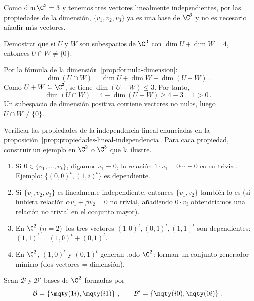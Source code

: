 \begin{questions}
\begin{solution}
    Como $\dim\C^3=3$ y tenemos tres vectores linealmente independientes, por las propiedades de la dimensión, $\{v_1,v_2,v_3\}$ ya es una base de $\C^3$ y no es necesario añadir más vectores.
  \end{solution}

  \question
  Demostrar que si $U$ y $W$ son subespacios de $\C^3$ con $\dim U+\dim W = 4$, entonces $U\cap W \neq \{0\}$.
  \begin{solution}
    Por la fórmula de la dimensión~\ref{prop:formula-dimension}:
    \[
      \dim(U\cap W) = \dim U + \dim W - \dim(U+W)\,.
    \]
    Como $U+W\subseteq\C^3$, se tiene $\dim(U+W)\leq 3$. Por tanto,
    \[
      \dim(U\cap W) = 4 - \dim(U+W) \geq 4-3 = 1 > 0\,.
    \]
    Un subespacio de dimensión positiva contiene vectores no nulos, luego $U\cap W\neq\{0\}$.
  \end{solution}


  \question \label{ejer:propiedades-lineal-independencia}
  Verificar las propiedades de la independencia lineal enunciadas en la proposición~\ref{prop:propiedades-lineal-independencia}. Para cada propiedad, construir un ejemplo en $\C^2$ o $\C^3$ que la ilustre.
  \begin{solution}
    \begin{enumerate}
      \item Si $0\in\{v_1,\ldots,v_k\}$, digamos $v_1=0$, la relación $1\cdot v_1+0\cdots=0$ es no trivial. Ejemplo: $\{(0,0)^t,(1,i)^t\}$ es dependiente.
      \item Si $\{v_1,v_2,v_3\}$ es linealmente independiente, entonces $\{v_1,v_2\}$ también lo es (si hubiera relación $\alpha v_1+\beta v_2=0$ no trivial, añadiendo $0\cdot v_3$ obtendríamos una relación no trivial en el conjunto mayor).
      \item En $\C^2$ ($n=2$), los tres vectores $(1,0)^t,(0,1)^t,(1,1)^t$ son dependientes: $(1,1)^t=(1,0)^t+(0,1)^t$.
      \item En $\C^2$, $(1,0)^t$ y $(0,1)^t$ generan todo $\C^2$: forman un conjunto generador mínimo (dos vectores = dimensión).
    \end{enumerate}
  \end{solution}

  \question
  Sean $\mathcal{B}$ y $\mathcal{B}'$ bases de $\C^2$ formadas por
  \[
    \mathcal{B} = \left\{\mqty(1\\i),\mqty(i\\1)\right\}\,,\qquad
    \mathcal{B}' = \left\{\mqty(i\\0),\mqty(0\\i)\right\}\,.
  \]
  \begin{parts}

\end{parts}
\end{questions}
